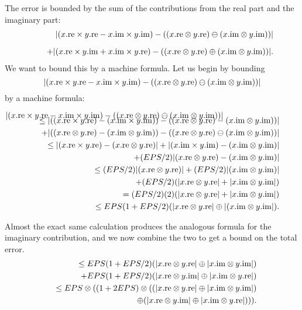 The error is bounded by the sum of the contributions from the real part and the imaginary part:
\begin{eqnarray*}
&&|(x.{\rm re} \times  y.{\rm re} - x.{\rm im} \times y.{\rm im}) - ((x.{\rm re} \otimes y.{\rm re}) \ominus
(x.{\rm im}
\otimes y.{\rm im}))| \\[6pt]
&&\quad + |(x.{\rm re} \times  y.{\rm im} + x.{\rm im} \times y.{\rm re}) - ((x.{\rm re} \otimes y.{\rm re}) \oplus (x.{\rm im}
\otimes y.{\rm im}))|.
\end{eqnarray*}
   We want to bound this by a machine formula.  Let us begin by bounding 
$$|(x.{\rm re} \times  y.{\rm re} - x.{\rm im} \times y.{\rm im}) - ((x.{\rm re} \otimes y.{\rm re}) \ominus (x.{\rm im}
 \otimes y.{\rm im}))| $$ 
by a machine formula:\eject

\centerline{
${\displaystyle |(x.{\rm re} \times  y.{\rm re} - x.{\rm im} \times y.{\rm im}) - ((x.{\rm re} \otimes y.{\rm re}) \ominus
(x.{\rm im}
\otimes y.{\rm im}))| }$}
\begin{eqnarray*}
\noalign{\vskip-16pt}
&&\le |((x.{\rm re} \times  y.{\rm re}) - (x.{\rm im} \times y.{\rm im})) - ((x.{\rm re} \otimes y.{\rm re}) -
(x.{\rm im}
\otimes y.{\rm im}))|\\
&&\quad + |((x.{\rm re} \otimes y.{\rm re}) - (x.{\rm im} \otimes y.{\rm im}))-((x.{\rm re} \otimes y.{\rm re})
\ominus (x.{\rm im} \otimes y.{\rm im}))| \\
&&\le |(x.{\rm re} \times  y.{\rm re}) - (x.{\rm re} \otimes y.{\rm re})| + |(x.{\rm
im} \times y.{\rm im})- (x.{\rm im} \otimes y.{\rm im})| \\
&&\quad + (EPS/2)|(x.{\rm re} \otimes y.{\rm re}) - (x.{\rm im} \otimes
y.{\rm im})|\\
&&\le (EPS/2)|(x.{\rm re} \otimes y.{\rm re})| + (EPS/2)|(x.{\rm im} \otimes y.{\rm im})| \\
&&\quad + (EPS/2)(|x.{\rm re} \otimes
y.{\rm re}| + |x.{\rm im} \otimes y.{\rm im}|)\\
&&= (EPS/2)(2) (|x.{\rm re} \otimes y.{\rm re}| + |x.{\rm im} \otimes y.{\rm
im}|)\\
&&\le EPS (1 + EPS/2) (|x.{\rm re} \otimes y.{\rm re}| \oplus |(x.{\rm im} \otimes y.{\rm im}|) .
\end{eqnarray*}


Almost the exact same calculation produces the analogous formula for the imaginary contribution, and we now combine the
two to get a bound on the total error.  
\begin{eqnarray*}
&&\le EPS (1 + EPS/2) (|x.{\rm re} \otimes y.{\rm re}| \oplus |x.{\rm im} \otimes y.{\rm im}|) \\
&&\quad +
EPS (1 + EPS/2) (|x.{\rm re} \otimes y.{\rm im}| \oplus |x.{\rm im} \otimes y.{\rm re}| )\\
&&\le EPS \otimes ((1 +
2EPS)\otimes((|x.{\rm re} \otimes y.{\rm re}| \oplus |x.{\rm im} \otimes y.{\rm im}| ) \\
&&\quad \oplus
(|x.{\rm re} \otimes y.{\rm im}| \oplus |x.{\rm im} \otimes y.{\rm re}| ))).
\\
\noalign{\vskip-36pt}
\end{eqnarray*}
\enddemo

